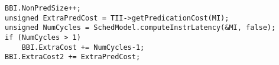 \begin{lstlisting}[style=CStyle]
BBI.NonPredSize++;
unsigned ExtraPredCost = TII->getPredicationCost(MI);
unsigned NumCycles = SchedModel.computeInstrLatency(&MI, false);
if (NumCycles > 1)
    BBI.ExtraCost += NumCycles-1;
BBI.ExtraCost2 += ExtraPredCost;
\end{lstlisting}